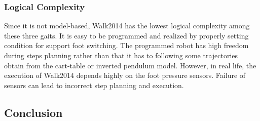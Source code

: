 \subsubsection{Logical Complexity}
Since it is not model-based, Walk2014 has the lowest logical complexity among these three gaits. It is easy to be programmed and realized by properly setting condition for support foot switching. The programmed robot has high freedom during steps planning rather than that it has to following some trajectories obtain from the cart-table or inverted pendulum model. However, in real life, the execution of Walk2014 depends highly on the foot pressure sensors. Failure of sensors can lead to incorrect step planning and execution.

\subsection{Conclusion}